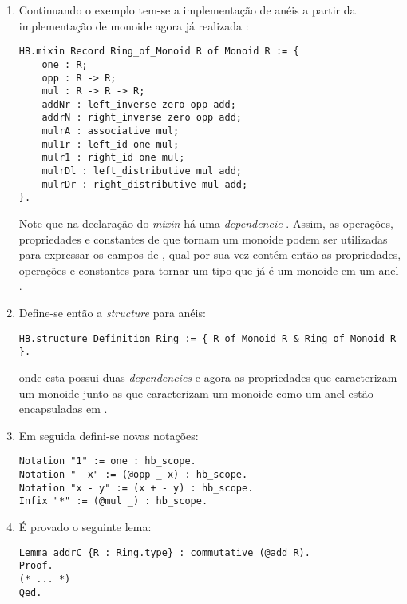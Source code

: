 {{\begin{enumerate}
        \item Continuando o exemplo tem-se a implementação de anéis a partir da implementação de monoide agora já realizada \cite{cohen:hal-02478907}:
            \begin{lstlisting}[language=coq, frame=single, tabsize=1]
HB.mixin Record Ring_of_Monoid R of Monoid R := {
    one : R;
    opp : R -> R;
    mul : R -> R -> R;
    addNr : left_inverse zero opp add;
    addrN : right_inverse zero opp add;
    mulrA : associative mul;
    mul1r : left_id one mul;
    mulr1 : right_id one mul;
    mulrDl : left_distributive mul add;
    mulrDr : right_distributive mul add;
}.
            \end{lstlisting}    
        Note que na declaração do \textit{mixin} há uma \textit{dependencie} . Assim, as operações, propriedades e constantes de que tornam  um monoide podem ser utilizadas para expressar os campos de , qual por sua vez contém então as propriedades, operações e constantes para tornar um tipo que já é um monoide em um anel \cite{cohen:hal-02478907}.
        
        \item Define-se então a \textit{structure} para anéis:
            \begin{lstlisting}[language=coq, frame=single, tabsize=1]
HB.structure Definition Ring := { R of Monoid R & Ring_of_Monoid R }.
            \end{lstlisting}
        onde esta possui duas \textit{dependencies} e agora as propriedades
        que caracterizam um monoide junto as que caracterizam um monoide como um anel estão encapsuladas em  \cite{cohen:hal-02478907}.

        \item Em seguida defini-se novas notações: 
            \begin{lstlisting}[language=coq, frame=single, tabsize=1]
Notation "1" := one : hb_scope.
Notation "- x" := (@opp _ x) : hb_scope.
Notation "x - y" := (x + - y) : hb_scope.
Infix "*" := (@mul _) : hb_scope.
            \end{lstlisting}

        \item É provado o seguinte lema:
            \begin{lstlisting}[language=coq, frame=single, tabsize=1]
Lemma addrC {R : Ring.type} : commutative (@add R).
Proof.
(* ... *)
Qed.
            \end{lstlisting}


\end{enumerate}}}
